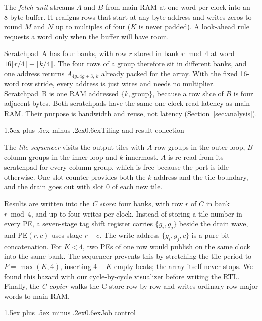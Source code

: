\documentclass[10pt,twocolumn,a4paper]{article}
\makeatletter
\renewcommand\subsection{\@startsection{subsection}{2}{\z@}%
  {1.5ex plus .5ex minus .2ex}{0.6ex}{\normalfont\itshape}}
\makeatother
\begin{document}
The \emph{fetch unit} streams $A$ and $B$ from main RAM at one word per clock
into an 8-byte buffer. It realigns rows that start at any byte address and
writes zeros to round $M$ and $N$ up to multiples of four ($K$ is never
padded). A look-ahead rule requests a word only when the buffer will have room.

Scratchpad~A has four banks, with row $r$ stored in bank $r \bmod 4$ at word
$16\lfloor r/4\rfloor+\lfloor k/4\rfloor$. The four rows of a group therefore
sit in different banks, and one address returns $A_{4g..4g+3,\,k}$ already
packed for the array. With the fixed 16-word row stride, every address is just
wires and needs no multiplier. Scratchpad~B is one RAM addressed
$\{k,\text{group}\}$, because a row slice of $B$ is four adjacent bytes. Both
scratchpads have the same one-clock read latency as main RAM. Their purpose is
bandwidth and reuse, not latency (Section~\ref{sec:analysis}).

\subsection{Tiling and result collection}

The \emph{tile sequencer} visits the output tiles with $A$ row groups in the
outer loop, $B$ column groups in the inner loop and $k$ innermost. $A$ is
re-read from its scratchpad for every column group, which is free because the
port is idle otherwise. One slot counter provides both the $k$ address and the
tile boundary, and the drain goes out with slot 0 of each new tile.

Results are written into the \emph{C store}: four banks, with row $r$ of $C$
in bank $r \bmod 4$, and up to four writes per clock. Instead of storing a tile
number in every PE, a seven-stage tag shift register carries $\{g_i,g_j\}$
beside the drain wave, and PE$(r,c)$ uses stage $r+c$. The write address
$\{g_i,g_j,c\}$ is a pure bit concatenation. For $K<4$, two PEs of one row
would publish on the same clock into the same bank. The sequencer prevents this
by stretching the tile period to $P=\max(K,4)$, inserting $4-K$ empty beats; the
array itself never stops. We found this hazard with our cycle-by-cycle
visualizer before writing the RTL. Finally, the \emph{C copier} walks the
C store row by row and writes ordinary row-major words to main RAM.

\subsection{Job control}
\end{document}
